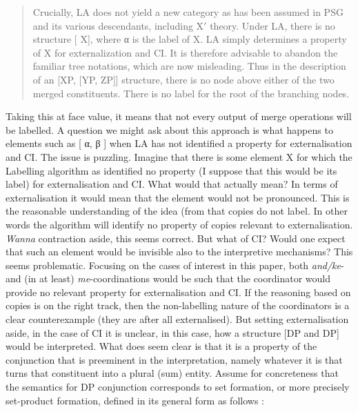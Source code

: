 \documentclass[output=paper]{langsci/langscibook}
\begin{document}
\begin{quote}

Crucially, \gls{LA} does not yield a new category as has been assumed in PSG
and its various descendants, including X$'$ theory. Under LA, there is no
structure [ X], where α is the label of X. \gls{LA} simply determines a
property of X for externalization and CI. It is therefore advisable to abandon
the familiar tree notations, which are now misleading.  Thus in the description
of an [XP, [YP, ZP]] structure, there is no node above either of the two merged
constituents. There is no label for the root of the branching nodes.

\end{quote}

Taking this at face value, it means that not every output of merge operations
will be labelled. A question we might ask about this approach is what happens
to elements such as [ α, β ] when \gls{LA} has not identified a property for
externalisation and CI. The issue is puzzling. Imagine that there is some
element X for which the Labelling algorithm as identified no property (I
suppose that this would be its label) for externalisation and CI. What would
that actually mean? In terms of externalisation it would mean that the element
would not be pronounced. This is the reasonable understanding of the idea (from
\citet{Chomsky2015} that copies do not label. In other words the algorithm will
identify no property of copies relevant to externalisation. \emph{Wanna}
contraction aside, this seems correct. But what of CI? Would one expect that
such an element would be invisible also to the interpretive mechanisms? This
seems problematic. Focusing on the cases of interest in this paper, both
\emph{and/ke}- and (in  at least) \emph{me}-coordinations would be such
that the coordinator would provide no relevant property for externalisation and
CI. If the reasoning based on copies is on the right track, then the
non-labelling nature of the coordinators is a clear counterexample (they are
after all externalised). But setting externalisation aside, in the case of CI
it is unclear, in this case, how a structure [DP and DP] would be
interpreted. What does seem clear is that it is a property of the conjunction
that is preeminent in the interpretation, namely whatever it is that turns that
constituent into a plural (sum) entity. Assume for concreteness that the
semantics for DP conjunction corresponds to set formation, or more precisely
set-product formation, defined in its general form as follows
\citep[241]{heycock-zamparelli:05a}:
\end{document}
